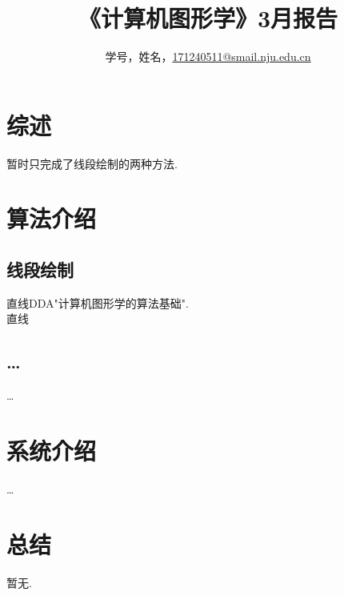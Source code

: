 \documentclass[a4paper,UTF8]{article}
\theoremstyle{definition}
\begin{document}
\title{\textbf{《计算机图形学》3月报告}}
\author{学号，姓名，\href{mailto:xxx@xxx.com}{171240511@smail.nju.edu.cn}}
\maketitle

\section{综述}
暂时只完成了线段绘制的两种方法.

\section{算法介绍}
\subsection{线段绘制}
直线DDA"计算机图形学的算法基础".\cite{rog_2002}\\
直线\\
\subsection{\dots}
\dots
		
\section{系统介绍}
\dots

\section{总结}
暂无.

%

\end{document}
